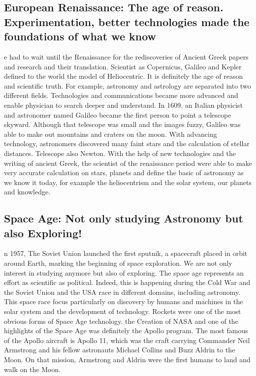 \subsection*{European Renaissance: The age of reason. Experimentation, better technologies made the foundations of what we know}
e had to wait until the Renaissance for the rediscoveries of Ancient Greek papers and research and their translation. Scientist as Copernicus, Galileo and Kepler defined to the world the model of Heliocentric. It is definitely the age of reason and scientific truth. For example, astronomy and astrology are separated into two different fields. Technologies and communications became more advanced and enable physician to search deeper and understand. In 1609, an Italian physicist and astronomer named Galileo became the first person to point a telescope skyward. Although that telescope was small and the images fuzzy, Galileo was able to make out mountains and craters on the moon. With advancing technology, astronomers discovered many faint stars and the calculation of stellar distances. Telescope also Newton. With the help of new technologies and the writing of ancient Greek, the scientist of the renaissance period were able to make very accurate calculation on stars, planets and define the basic of astronomy as we know it today, for example the heliocentrism and the solar system, our planets and knowledge.

\subsection*{Space Age: Not only studying Astronomy but also Exploring!}
n 1957, The Soviet Union launched the first sputnik, a spacecraft placed in orbit around Earth, marking the beginning of space exploration. We are not only interest in studying anymore but also of exploring. The space age represents an effort as scientific as political. Indeed, this is happening during the Cold War and the Soviet Union and the USA race in different domains, including astronomy. This space race focus particularly on discovery by humans and machines in the solar system and the development of technology. Rockets were one of the most obvious forms of Space Age technology. the Creation of NASA and one of the highlights of the Space Age was definitely the Apollo program. The most famous of the Apollo aircraft is Apollo 11, which was the craft carrying Commander Neil Armstrong and his fellow astronauts Michael Collins and Buzz Aldrin to the Moon. On that mission, Armstrong and Aldrin were the first humans to land and walk on the Moon.